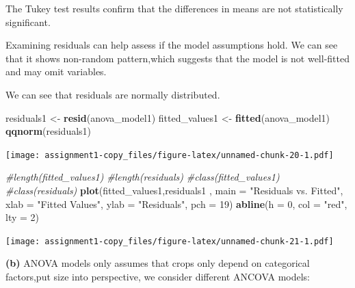 \documentclass[
]{article}
\newenvironment{Shaded}{\begin{snugshade}}{\end{snugshade}}
\newcommand{\AttributeTok}[1]{\textcolor[rgb]{0.13,0.29,0.53}{#1}}
\newcommand{\CommentTok}[1]{\textcolor[rgb]{0.56,0.35,0.01}{\textit{#1}}}
\newcommand{\ConstantTok}[1]{\textcolor[rgb]{0.56,0.35,0.01}{#1}}
\newcommand{\DecValTok}[1]{\textcolor[rgb]{0.00,0.00,0.81}{#1}}
\newcommand{\FunctionTok}[1]{\textcolor[rgb]{0.13,0.29,0.53}{\textbf{#1}}}
\newcommand{\NormalTok}[1]{#1}
\newcommand{\OtherTok}[1]{\textcolor[rgb]{0.56,0.35,0.01}{#1}}
\newcommand{\SpecialCharTok}[1]{\textcolor[rgb]{0.81,0.36,0.00}{\textbf{#1}}}
\newcommand{\StringTok}[1]{\textcolor[rgb]{0.31,0.60,0.02}{#1}}
\begin{document}
The Tukey test results confirm that the differences in means are not
statistically significant.

Examining residuals can help assess if the model assumptions hold. We
can see that it shows non-random pattern,which suggests that the model
is not well-fitted and may omit variables.

We can see that residuals are normally distributed.

\begin{Shaded}
\begin{Highlighting}[]
\NormalTok{residuals1 }\OtherTok{\textless{}{-}} \FunctionTok{resid}\NormalTok{(anova\_model1)}
\NormalTok{fitted\_values1 }\OtherTok{\textless{}{-}} \FunctionTok{fitted}\NormalTok{(anova\_model1) }
\FunctionTok{qqnorm}\NormalTok{(residuals1)}
\end{Highlighting}
\end{Shaded}

\texttt{[image: assignment1-copy\_files/figure-latex/unnamed-chunk-20-1.pdf]}

\begin{Shaded}
\begin{Highlighting}[]
\CommentTok{\#length(fitted\_values1)}
\CommentTok{\#length(residuals)}
\CommentTok{\#class(fitted\_values1)}
\CommentTok{\#class(residuals)}
\FunctionTok{plot}\NormalTok{(fitted\_values1,residuals1 , }\AttributeTok{main =} \StringTok{"Residuals vs. Fitted"}\NormalTok{, }
     \AttributeTok{xlab =} \StringTok{"Fitted Values"}\NormalTok{, }\AttributeTok{ylab =} \StringTok{"Residuals"}\NormalTok{, }\AttributeTok{pch =} \DecValTok{19}\NormalTok{)}
\FunctionTok{abline}\NormalTok{(}\AttributeTok{h =} \DecValTok{0}\NormalTok{, }\AttributeTok{col =} \StringTok{"red"}\NormalTok{, }\AttributeTok{lty =} \DecValTok{2}\NormalTok{)}
\end{Highlighting}
\end{Shaded}

\texttt{[image: assignment1-copy\_files/figure-latex/unnamed-chunk-21-1.pdf]}

\textbf{(b)} ANOVA models only assumes that crops only depend on
categorical factors,put size into perspective, we consider different
ANCOVA models:

\begin{Shaded}
\end{Shaded}
\end{document}
